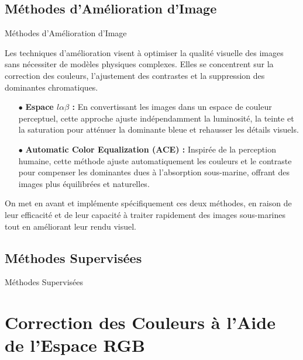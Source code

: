 \documentclass[8pt,a4paper]{beamer}
\numberwithin{figure}{section}
\begin{document}
\subsection{Méthodes d'Amélioration d'Image}
\begin{frame}{Méthodes d'Amélioration d'Image}
\par Les techniques d’amélioration visent à optimiser la qualité visuelle des images sans nécessiter de modèles physiques complexes. Elles se concentrent sur la correction des couleurs, l'ajustement des contrastes et la suppression des dominantes chromatiques.
\vspace{3mm}
\begin{itemize}
\item[$\bullet$] \textbf{Espace $l\alpha\beta$ :} En convertissant les images dans un espace de couleur perceptuel, cette approche ajuste indépendamment la luminosité, la teinte et la saturation pour atténuer la dominante bleue et rehausser les détails visuels.
\item[$\bullet$] \textbf{Automatic Color Equalization (ACE) :} Inspirée de la perception humaine, cette méthode ajuste automatiquement les couleurs et le contraste pour compenser les dominantes dues à l’absorption sous-marine, offrant des images plus équilibrées et naturelles.
\end{itemize}
\vspace{3mm}
On met en avant et implémente spécifiquement ces deux méthodes, en raison de leur efficacité et de leur capacité à traiter rapidement des images sous-marines tout en améliorant leur rendu visuel.
\end{frame}

\subsection{Méthodes Supervisées}
\begin{frame}{Méthodes Supervisées}

\end{frame}

\section{Correction des Couleurs à l'Aide de l'Espace RGB}
\frame{\tableofcontents[currentsection]}
\end{document}
